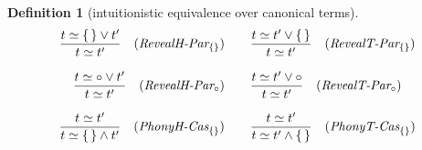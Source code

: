 \documentclass[12pt]{article}
\newtheorem{Definition}{Definition}[section]
\begin{document}
\begin{Definition}[intuitionistic equivalence over canonical terms]
\begin{displaymath}
\begin{array}{c}
      \begin{array}{ll}
        \begin{array}{rl}
          \dfrac{ t \simeq \{\,\} \vee t' }{
            t \simeq t'
          }  &  (\text{\it RevealH-Par}_{\{\}})
        \end{array}
        & \begin{array}{rl}
            \dfrac{ t \simeq t' \vee \{\,\} }{
              t \simeq t'
            }  &  (\text{\it RevealT-Par}_{\{\}})
          \end{array}
      \end{array}  \\
      \\

      \begin{array}{ll}
        \begin{array}{rl}
          \dfrac{ t \simeq \circ \vee t' }{
            t \simeq t'
          }  &  (\text{\it RevealH-Par}_\circ)
        \end{array}
        & \begin{array}{rl}
            \dfrac{ t \simeq t' \vee \circ }{
              t \simeq t'
            }  &  (\text{\it RevealT-Par}_\circ)
          \end{array}
      \end{array}
      
    \end{array}
  \end{displaymath}
  
  \begin{displaymath}
    \begin{array}{c}
      

      
      \begin{array}{ll}
        \begin{array}{rl}
          \dfrac{ t \simeq t' }{
            t \simeq \{\,\} \wedge t'
          }  &  (\text{\it PhonyH-Cas}_{\{\}})
        \end{array}
        & \begin{array}{rl}
            \dfrac{ t \simeq t' }{
              t \simeq t' \wedge \{\,\}
            }  &  (\text{\it PhonyT-Cas}_{\{\}})
          \end{array}
      \end{array}  \\
      \\
      

\end{array}
\end{displaymath}
\end{Definition}
\end{document}
